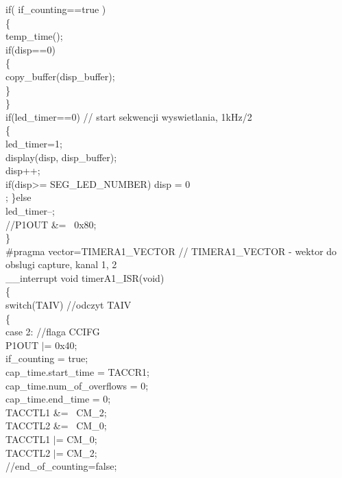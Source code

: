 \documentclass[a4paper,titlepage,11pt,floatssmall]{mwrep}
\begin{document}
	if( if\_{}counting==true )\\
	\{\\
		temp\_{}time();\\

		if(disp==0)\\
		\{\\
			copy\_{}buffer(disp\_{}buffer);\\
		\}\\
	\}\\

	if(led\_{}timer==0) // start sekwencji wyswietlania, 1kHz/2\\
	\{\\
		led\_{}timer=1;\\
		display(disp, disp\_{}buffer);\\
		disp++;\\
		if(disp>= SEG\_{}LED\_{}NUMBER) disp = 0\\;
	\}else\\
		led\_{}timer--;\\

    //P1OUT \&= ~0x80;\\
\}\\

\noindent \#pragma vector=TIMERA1\_{}VECTOR   // TIMERA1\_{}VECTOR - wektor do obslugi capture, kanal 1, 2\\
\_{}\_{}interrupt void timerA1\_{}ISR(void)\\
\{\\
    switch(TAIV) //odczyt TAIV\\
    \{\\
        case 2: //flaga CCIFG\\
            P1OUT $\vert$= 0x40;\\
        	if\_{}counting = true;\\
            cap\_{}time.start\_{}time = TACCR1;\\
            cap\_{}time.num\_{}of\_{}overflows = 0;\\
            cap\_{}time.end\_{}time = 0;\\

            TACCTL1 \&= ~CM\_{}2;\\
            TACCTL2 \&= ~CM\_{}0;\\
            TACCTL1 $\vert$= CM\_{}0;\\
            TACCTL2 $\vert$= CM\_{}2;\\

			//end\_{}of\_{}counting=false;\\
\end{document}
